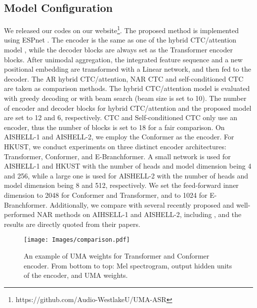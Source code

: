 \documentclass{article}
\begin{document}
\subsection{Model Configuration}
We released our codes on our website\footnote{https://github.com/Audio-WestlakeU/UMA-ASR}. The proposed method is implemented using ESPnet \cite{watanabe2018espnet}.
The encoder is the same as one of the hybrid CTC/attention model \cite{watanabe2017hybrid}, while the decoder blocks are always set as the Transformer encoder blocks. After unimodal aggregation, the integrated feature sequence and a new positional embedding are transformed with a Linear network, and then fed to the decoder. 
The AR hybrid CTC/attention, NAR CTC and self-conditioned CTC \cite{nozaki2021relaxing} are taken as comparison methods. 
The hybrid CTC/attention model is evaluated with greedy decoding or with beam search (beam size is set to 10).
The number of encoder and decoder blocks for hybrid CTC/attention and the proposed model are set to 12 and 6, respectively. CTC and Self-conditioned CTC only use an encoder, thus the number of blocks is set to 18 for a fair comparison. 
On AISHELL-1 and AISHELL-2, we employ the Conformer as the encoder. 
For HKUST, we conduct experiments on three distinct encoder architectures: Transformer, Conformer, and E-Branchformer. A small network is used for AISHELL-1 and HKUST with the number of heads and model dimension being 4 and 256, while a large one is used for AISHELL-2 with the number of heads and model dimension being 8 and 512, respectively.    
We set the feed-forward inner dimension to 2048 for Conformer and Transformer, and to 1024 for E-Branchformer. 
Additionally, we compare with several recently proposed and well-performed NAR methods on AIHSELL-1 and AISHELL-2, including \cite{bai2021fast,dong2020cif,Gao2022ParaformerFA}, and the results are directly quoted from their papers.


\begin{figure}[t]
\centering
\centerline{\texttt{[image: Images/comparison.pdf]}}
\caption{An example of UMA weights for Transformer and Conformer encoder. From bottom to top: Mel spectrogram, output hidden units of the encoder, and UMA weights.}
\label{fig:example}
\vspace{-0.4cm}
\end{figure}
\end{document}
